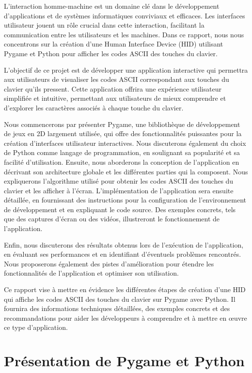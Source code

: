 \documentclass[12pt,a4paper]{report}
\begin{document}
L'interaction homme-machine est un domaine clé dans le développement d'applications et de systèmes informatiques conviviaux et efficaces. Les interfaces utilisateur jouent un rôle crucial dans cette interaction, facilitant la communication entre les utilisateurs et les machines. Dans ce rapport, nous nous concentrons sur la création d'une Human Interface Device (HID) utilisant Pygame et Python pour afficher les codes ASCII des touches du clavier.

L'objectif de ce projet est de développer une application interactive qui permettra aux utilisateurs de visualiser les codes ASCII correspondant aux touches du clavier qu'ils pressent. Cette application offrira une expérience utilisateur simplifiée et intuitive, permettant aux utilisateurs de mieux comprendre et d'explorer les caractères associés à chaque touche du clavier.

Nous commencerons par présenter Pygame, une bibliothèque de développement de jeux en 2D largement utilisée, qui offre des fonctionnalités puissantes pour la création d'interfaces utilisateur interactives. Nous discuterons également du choix de Python comme langage de programmation, en soulignant sa popularité et sa facilité d'utilisation. Ensuite, nous aborderons la conception de l'application en décrivant son architecture globale et les différentes parties qui la composent. Nous expliquerons l'algorithme utilisé pour obtenir les codes ASCII des touches du clavier et les afficher à l'écran. L'implémentation de l'application sera ensuite détaillée, en fournissant des instructions pour la configuration de l'environnement de développement et en expliquant le code source. Des exemples concrets, tels que des captures d'écran ou des vidéos, illustreront le fonctionnement de l'application.

Enfin, nous discuterons des résultats obtenus lors de l'exécution de l'application, en évaluant ses performances et en identifiant d'éventuels problèmes rencontrés. Nous proposerons également des pistes d'amélioration pour étendre les fonctionnalités de l'application et optimiser son utilisation.

Ce rapport vise à mettre en évidence les différentes étapes de création d'une HID qui affiche les codes ASCII des touches du clavier sur Pygame avec Python. Il fournira des informations techniques détaillées, des exemples concrets et des recommandations pour aider les développeurs à comprendre et à mettre en œuvre ce type d'application.
\newpage

\section{Présentation de Pygame et Python}
\end{document}
